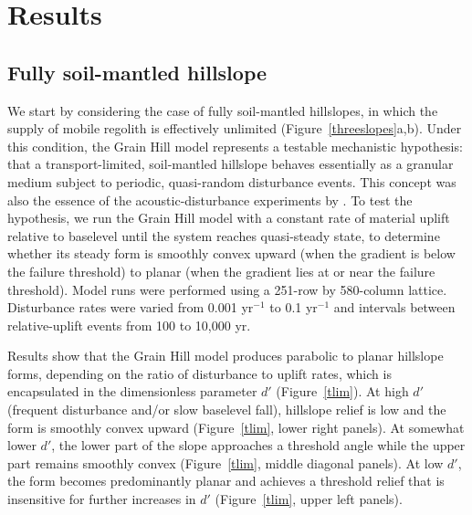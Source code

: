 \documentclass[esurf, manuscript]{copernicus}
\begin{document}
%


\section{Results}

\subsection{Fully soil-mantled hillslope}

We start by considering the case of fully soil-mantled hillslopes, in which the supply of mobile regolith is effectively unlimited (Figure~\ref{threeslopes}a,b). Under this condition, the Grain Hill model represents a testable mechanistic hypothesis: that a transport-limited, soil-mantled hillslope behaves essentially as a granular medium subject to periodic, quasi-random disturbance events. This concept was also the essence of the acoustic-disturbance experiments by \citet{roering2001hillslope}. To test the hypothesis, we run the Grain Hill model with a constant rate of material uplift relative to baselevel until the system reaches quasi-steady state, to determine whether its steady form is smoothly convex upward (when the gradient is below the failure threshold) to planar (when the gradient lies at or near the failure threshold). Model runs were performed using a 251-row by 580-column lattice. Disturbance rates were varied from 0.001 yr$^{-1}$ to 0.1 yr$^{-1}$ and intervals between relative-uplift events from 100 to 10,000 yr.  

Results show that the Grain Hill model produces parabolic to planar hillslope forms, depending on the ratio of disturbance to uplift rates, which is encapsulated in the dimensionless parameter $d'$ (Figure~\ref{tlim}). At high $d'$ (frequent disturbance and/or slow baselevel fall), hillslope relief is low and the form is smoothly convex upward (Figure~\ref{tlim}, lower right panels). At somewhat lower $d'$, the lower part of the slope approaches a threshold angle while the upper part remains smoothly convex (Figure~\ref{tlim}, middle diagonal panels). At low $d'$, the form becomes predominantly planar and achieves a threshold relief that is insensitive for further increases in $d'$ (Figure~\ref{tlim}, upper left panels).
\end{document}
